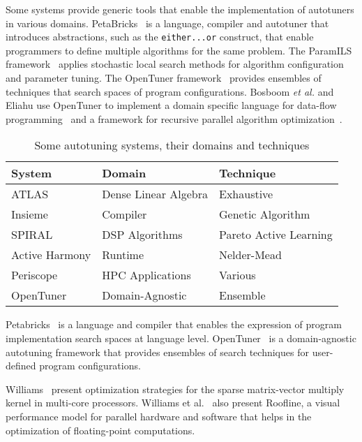 Some systems provide generic tools that enable the implementation of
autotuners in various domains. PetaBricks~\cite{ansel2009petabricks} is a
language, compiler and autotuner that introduces abstractions, such as the
\texttt{\footnotesize either...or} construct, that enable programmers to define
multiple algorithms for the same problem.  The ParamILS
framework~\cite{hutter2009paramils} applies stochastic local search methods
for algorithm configuration and parameter tuning. The OpenTuner
framework~\cite{ansel2014opentuner} provides ensembles of techniques that
search spaces of program configurations. Bosboom \emph{et al.} and Eliahu use
OpenTuner to implement a domain specific language for data-flow
programming~\cite{bosboom2014streamjit} and a framework for recursive parallel
algorithm optimization~\cite{eliahu2015frpa}.

\begin{table}[htpb]
    \centering
    \begin{tabular}{@{}lll@{}}
        \toprule
        System & Domain & Technique \\ \midrule
        ATLAS & Dense Linear Algebra & Exhaustive \\
        Insieme & Compiler & Genetic Algorithm \\
        SPIRAL & DSP Algorithms & Pareto Active Learning \\
        Active Harmony & Runtime & Nelder-Mead \\
        Periscope & HPC Applications & Various \\
        OpenTuner & Domain-Agnostic & Ensemble \\ \bottomrule
    \end{tabular}
    \caption{Some autotuning systems, their domains and techniques}
\end{table}

Petabricks~\cite{ansel2009petabricks} is a language and compiler that enables
the expression of program implementation search spaces at language level.
OpenTuner~\cite{ansel2014opentuner} is a domain-agnostic autotuning framework
that provides ensembles of search techniques for user-defined program
configurations.

Williams~\cite{williams2009optimization} present optimization strategies for
the sparse matrix-vector multiply kernel in multi-core processors.  Williams et
al.~\cite{williams2009roofline} also present Roofline, a visual performance
model for parallel hardware and software that helps in the optimization of
floating-point computations.

